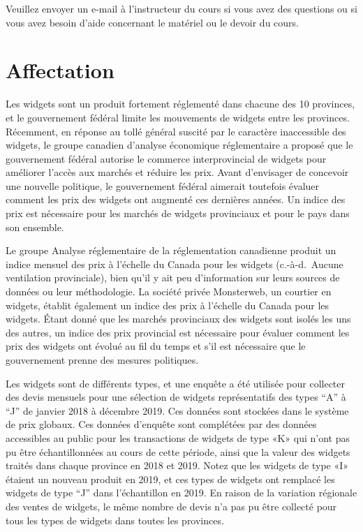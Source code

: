 \documentclass[]{article}
\begin{document}
Veuillez envoyer un e-mail à l'instructeur du cours si vous avez des questions ou si vous avez besoin d'aide concernant le matériel ou le devoir du cours.

\hypertarget{affectation-2}{%
\section{Affectation}\label{affectation-2}}

Les widgets sont un produit fortement réglementé dans chacune des 10 provinces, et le gouvernement fédéral limite les mouvements de widgets entre les provinces. Récemment, en réponse au tollé général suscité par le caractère inaccessible des widgets, le groupe canadien d'analyse économique réglementaire a proposé que le gouvernement fédéral autorise le commerce interprovincial de widgets pour améliorer l'accès aux marchés et réduire les prix. Avant d'envisager de concevoir une nouvelle politique, le gouvernement fédéral aimerait toutefois évaluer comment les prix des widgets ont augmenté ces dernières années. Un indice des prix est nécessaire pour les marchés de widgets provinciaux et pour le pays dans son ensemble.

Le groupe Analyse réglementaire de la réglementation canadienne produit un indice mensuel des prix à l'échelle du Canada pour les widgets (c.-à-d.~Aucune ventilation provinciale), bien qu'il y ait peu d'information sur leurs sources de données ou leur méthodologie. La société privée Monsterweb, un courtier en widgets, établit également un indice des prix à l'échelle du Canada pour les widgets. Étant donné que les marchés provinciaux des widgets sont isolés les uns des autres, un indice des prix provincial est nécessaire pour évaluer comment les prix des widgets ont évolué au fil du temps et s'il est nécessaire que le gouvernement prenne des mesures politiques.

Les widgets sont de différents types, et une enquête a été utilisée pour collecter des devis mensuels pour une sélection de widgets représentatifs des types ``A'' à ``J'' de janvier 2018 à décembre 2019. Ces données sont stockées dans le système de prix globaux. Ces données d'enquête sont complétées par des données accessibles au public pour les transactions de widgets de type «K» qui n'ont pas pu être échantillonnées au cours de cette période, ainsi que la valeur des widgets traités dans chaque province en 2018 et 2019. Notez que les widgets de type «I» étaient un nouveau produit en 2019, et ces types de widgets ont remplacé les widgets de type ``J'' dans l'échantillon en 2019. En raison de la variation régionale des ventes de widgets, le même nombre de devis n'a pas pu être collecté pour tous les types de widgets dans toutes les provinces.
\end{document}
